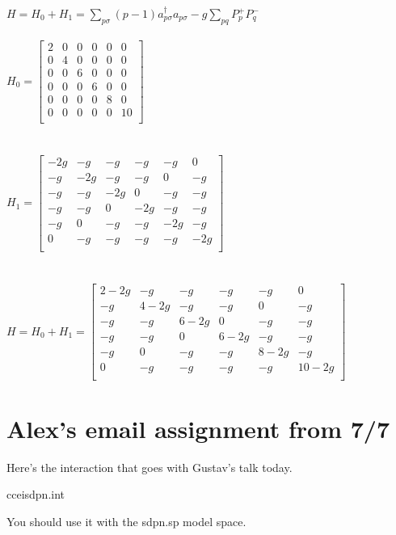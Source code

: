 \documentclass[12pt]{article}
\begin{document}
$H=H_0+H_1=\sum\limits_{p\sigma}  (p-1)a_{p\sigma}^\dagger a_{p\sigma} -g\sum\limits_{pq} P_{p}^{+}P_{q}^{-}$
\\
\\
$H_0=
\begin{bmatrix}
	2 & 0 & 0 & 0 & 0 & 0\\
	0 & 4 & 0 & 0 & 0 & 0 \\
	0 & 0 & 6 & 0 & 0 & 0\\
	0 & 0 & 0 & 6 & 0 & 0 \\
	0 & 0 & 0 & 0 & 8 & 0 \\
	0 & 0 & 0 & 0 & 0 & 10\\
\end{bmatrix}$
\\
\\
\\
$H_1=
\begin{bmatrix}
	-2g & -g & -g & -g & -g & 0\\
	-g & -2g & -g & -g & 0    & -g \\
	-g & -g & -2g & 0 & -g & -g\\
	-g & -g & 0 & -2g & -g & -g\\
	-g & 0 & -g & -g & -2g & -g\\
	0 & -g & -g & -g & -g & -2g\\
\end{bmatrix}$
\\
\\
\\
$H=H_0+H_1=
\begin{bmatrix}
	2-2g & -g & -g & -g & -g & 0\\
	-g & 4-2g & -g & -g & 0    & -g \\
	-g & -g & 6-2g & 0 & -g & -g\\
	-g & -g & 0 & 6-2g & -g & -g\\
	-g & 0 & -g & -g & 8-2g & -g\\
	0 & -g & -g & -g & -g & 10-2g\\
\end{bmatrix}$	



    
    
    
\newpage    
\section{Alex's email assignment from 7/7}
   Here's the interaction that goes with Gustav's talk today.

cceisdpn.int

You should use it with the sdpn.sp model space.
\end{document}
